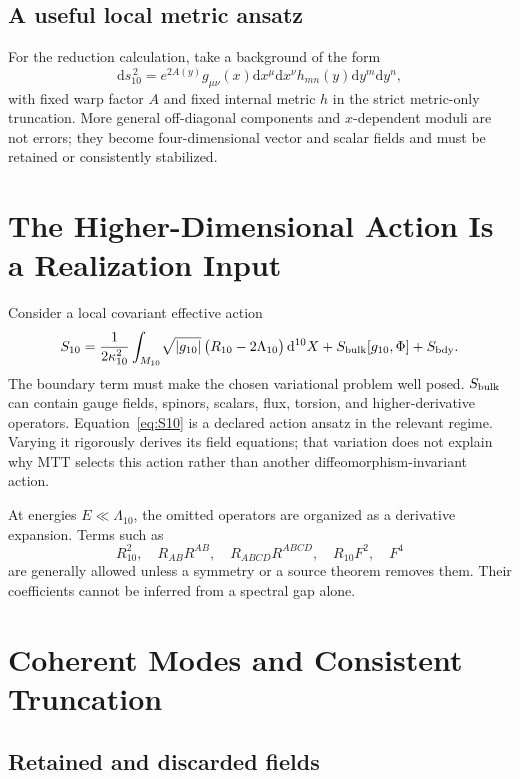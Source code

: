 \documentclass[11pt,a4paper]{article}
\theoremstyle{definition}
\theoremstyle{remark}
\newcommand{\dd}{\mathrm d}
\begin{document}
\subsection{A useful local metric ansatz}

For the reduction calculation, take a background of the form
\begin{equation}
 \dd s_{10}^{\,2}
 =e^{2A(y)}g_{\mu\nu}(x)\dd x^\mu\dd x^\nu
  h_{mn}(y)\dd y^m\dd y^n ,
\label{eq:warpedmetric}
\end{equation}
with fixed warp factor \(A\) and fixed internal metric \(h\) in the strict
metric-only truncation.  More general off-diagonal components and
\(x\)-dependent moduli are not errors; they become four-dimensional vector
and scalar fields and must be retained or consistently stabilized.

\section{The Higher-Dimensional Action Is a Realization Input}

Consider a local covariant effective action
\begin{equation}
 S_{10}
 =\frac{1}{2\kappa_{10}^{2}}
  \int_{M_{10}}\!\sqrt{|g_{10}|}\,
  \bigl(R_{10}-2\Lambda_{10}\bigr)\,\dd^{10}X
 +S_{\rm bulk}[g_{10},\Phi]
 +S_{\rm bdy}.
\label{eq:S10}
\end{equation}
The boundary term must make the chosen variational problem well posed.
\(S_{\rm bulk}\) can contain gauge fields, spinors, scalars, flux, torsion,
and higher-derivative operators.  Equation~\eqref{eq:S10} is a declared
action ansatz in the relevant regime.  Varying it rigorously derives its field
equations; that variation does not explain why MTT selects this action rather
than another diffeomorphism-invariant action.

At energies \(E\ll\Lambda_{10}\), the omitted operators are organized as a
derivative expansion.  Terms such as
\[
 R_{10}^{2},\quad R_{AB}R^{AB},\quad
 R_{ABCD}R^{ABCD},\quad R_{10}F^2,\quad F^4
\]
are generally allowed unless a symmetry or a source theorem removes them.
Their coefficients cannot be inferred from a spectral gap alone.

\section{Coherent Modes and Consistent Truncation}

\subsection{Retained and discarded fields}
\end{document}
